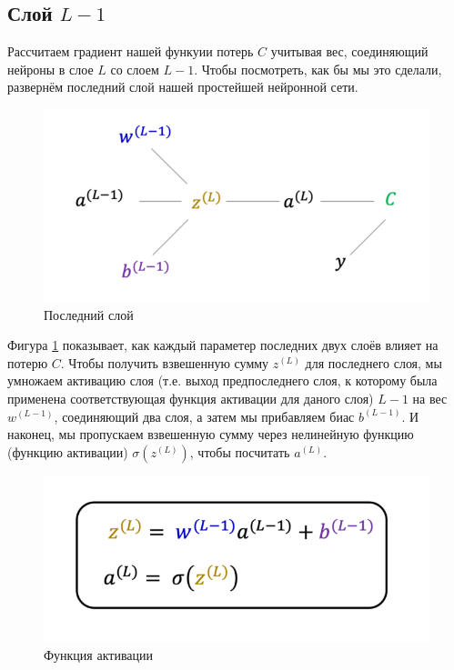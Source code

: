 \documentclass[a4paper, 10pt, openany]{book} %
\begin{document}
	\subsection{Слой $L-1$}
	
	Рассчитаем градиент нашей функуии потерь $C$ учитывая вес, соединяющий нейроны в слое $L$ со слоем $L-1$. Чтобы посмотреть, как бы мы это сделали, развернём последний слой нашей простейшей нейронной сети.
	
	\begin{figure}[h!]
		\centering
		\includegraphics[width=\linewidth]{pictures/backpropagation/last_layer.png}
		\caption{Последний слой}
		\label{last_layer}
	\end{figure}
	
	Фигура \ref{last_layer} показывает, как каждый параметер последних двух слоёв влияет на потерю $C$. Чтобы получить взвешенную сумму $z^{(L)}$ для последнего слоя, мы умножаем активацию слоя (т.е. выход предпоследнего слоя, к которому была применена соответствующая функция активации для даного слоя) $L-1$ на вес $w^{(L-1)}$, соединяющий два слоя, а затем мы прибавляем биас $b^{(L-1)}$. И наконец, мы пропускаем взвешенную сумму через нелинейную функцию (функцию активации) $\sigma(z^{(L)})$, чтобы посчитать $a^{(L)}$.
	
	\begin{figure}[h!]
		\centering
		\includegraphics[width=\linewidth]{pictures/backpropagation/sigma.png}
		\caption{Функция активации}
		\label{weighted_sum}
	\end{figure}
	
\end{document}
